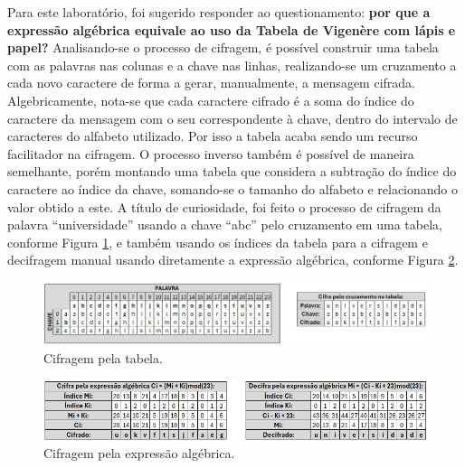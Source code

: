 \documentclass[12pt, a4paper]{article}
\begin{document}
Para este laboratório, foi sugerido responder ao questionamento: \textbf{por que a expressão algébrica equivale ao uso da Tabela
de Vigenère com lápis e papel?} Analisando-se o processo de cifragem, é possível construir uma tabela com as palavras nas colunas
e a chave nas linhas, realizando-se um cruzamento a cada novo caractere de forma a gerar, manualmente, a mensagem cifrada. 
Algebricamente, nota-se que cada caractere cifrado é a soma do índice do caractere da mensagem com o seu correspondente à chave,
dentro do intervalo de caracteres do alfabeto utilizado. Por isso a tabela acaba sendo um recurso facilitador na cifragem.
O processo inverso também é possível de maneira semelhante, porém montando uma tabela que considera a subtração do índice do
caractere ao índice da chave, somando-se o tamanho do alfabeto e relacionando o valor obtido a este.
A título de curiosidade, foi feito o processo de cifragem da palavra ``universidade'' usando a chave ``abc'' pelo cruzamento 
em uma tabela, conforme Figura \ref{fig:vigeneretabela}, e também usando os índices da tabela para a cifragem e decifragem manual
usando diretamente a expressão algébrica, conforme Figura \ref{fig:vigenereexpressao}.

\begin{figure}[!htpb]
    \centering
    \includegraphics[scale=0.5]{img/vigenere-tabela.jpg}
    \caption{Cifragem pela tabela.}
    \label{fig:vigeneretabela}
\end{figure}

\begin{figure}[!htpb]
    \centering
    \includegraphics[scale=0.5]{img/vigenere-expres.jpg}
    \caption{Cifragem pela expressão algébrica.}
    \label{fig:vigenereexpressao}
\end{figure}
\end{document}
